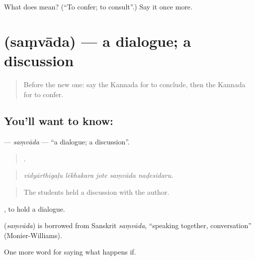 \begin{tcolorbox}[breakable,colback=teal!4,colframe=teal!35!black,title={Before you move on}]
What does  mean? (\textquotedblleft{}To confer; to consult\textquotedblright{}.) Say it once more.
\end{tcolorbox}
\section[\texorpdfstring{\kn{ಸಂವಾದ} (saṃvāda)}{ಸಂವಾದ (saṃvāda)}]{ (saṃvāda) — a dialogue; a discussion}

\label{lesson:KA-C431-samvada}



\begin{quote}
Before the new one: say the Kannada for to conclude, then the Kannada for to confer.
\end{quote}

\subsection*{You'll want to know: }
\textbf{} — \emph{saṃvāda} — \textquotedblleft{}a dialogue; a discussion\textquotedblright{}.

\begin{quote}
    .
\end{quote}

\begin{quote}
\emph{vidyārthigaḷu lēkhakara jote saṃvāda naḍesidaru.}
\end{quote}

\begin{quote}
The students held a discussion with the author.
\end{quote}

 , to hold a dialogue.

\begin{cousinweb}
\textbf{} (\emph{saṃvāda}) is borrowed from Sanskrit \emph{saṃvāda}, \textquotedblleft{}speaking together, conversation\textquotedblright{} (Monier-Williams).
\end{cousinweb}

\begin{grammarlens}[title={What you've built}]
One more word for saying what happens if.
\end{grammarlens}

